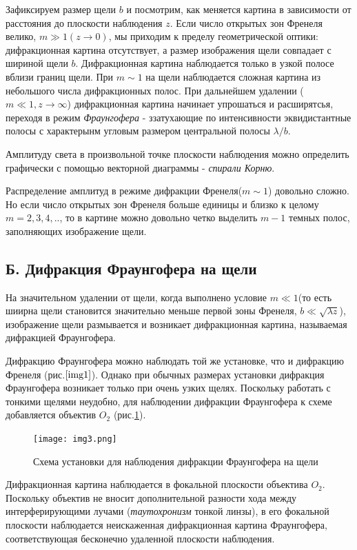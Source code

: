 \documentclass[a4paper,12pt]{article}
\begin{document}
Зафиксируем размер щели $b$ и посмотрим, как меняется картина в зависимости от расстояния до плоскости наблюдения $z$. Если число открытых зон Френеля велико, $m \gg 1 (z\longrightarrow 0)$, мы приходим к пределу геометрической оптики: дифракционная картина отсутствует, а размер изображения щели совпадает с шириной щели $b$. Дифракционная картина наблюдается только в узкой полосе вблизи границ щели. При $m \sim 1$ на щели наблюдается сложная картина из небольшого числа дифракционных полос. При дальнейшем удалении ($m\ll1, z\longrightarrow\infty$) дифракционная картина начинает упрошаться и расширятсья, переходя в режим \textit{Фраунгофера} - ззатухающие по интенсивности эквидистантные полосы с характерынм угловым размером центральной полосы $\lambda/b$.

Амплитуду света в произвольной точке плоскости наблюдения можно определить графически с помощью векторной диаграммы - \textit{спирали Корню}.

Распределение амплитуд в режиме дифракции Френеля($m\sim1$) довольно сложно. Но если число открытых зон Френеля больше единицы и близко к целому $m=2,3,4,..$, то в картине можно довольно четко выделить $m-1$ темных полос, заполняющих изображение щели. 

\subsection{Б. Дифракция Фраунгофера на щели}
На значительном удалении от щели, когда выполнено условие $m\ll 1$(то есть шиирна щели становится значительно меньше первой зоны Френеля, $b\ll\sqrt{\lambda z}$), изображение щели размывается и возникает дифракционная картина, называемая дифракцией Фраунгофера.

Дифракцию Фраунгофера можно наблюдать той же установке, что и дифракцию Френеля (рис.$\ref{img1}$). Однако при обычных размерах установки дифракция Фраунгофера возникает только при очень узких щелях. Поскольку работать с тонкими щелями неудобно, для наблюдении дифракции Фраунгофера к схеме добавляется объектив $O_2$ (рис.\ref{img3}).

\begin{figure}[h]
\centering
\texttt{[image: img3.png]}
\caption{Схема установки для наблюдения дифракции Фраунгофера на щели}
\label{img3}
\end{figure}

Дифракционная картина наблюдается в фокальной плоскости объектива $O_2$. Поскольку объектив не вносит дополнительной разности хода между интерферирующими лучами (\textit{таутохронизм} тонкой линзы), в его фокальной плоскости наблюдается неискаженная дифракционная картина Фраунгофера, соответствующая бесконечно удаленной плоскости наблюдения.
\end{document}
